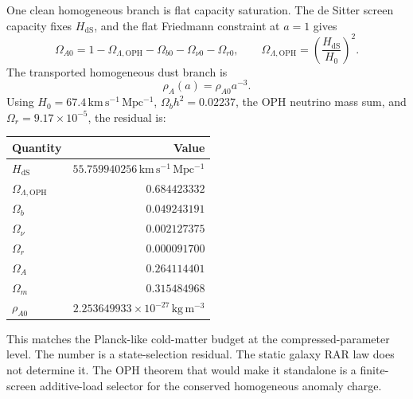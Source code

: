 \documentclass[11pt]{article}
\newcommand{\OPH}{\mathrm{OPH}}
\begin{document}
One clean homogeneous branch is flat capacity saturation.  The de Sitter screen
capacity fixes \(H_{\mathrm{dS}}\), and the flat Friedmann constraint at
\(a=1\) gives
\begin{equation}
  \Omega_{A0}
  =
  1-\Omega_{\Lambda,\OPH}-\Omega_{b0}-\Omega_{\nu0}-\Omega_{r0},
  \qquad
  \Omega_{\Lambda,\OPH}
  =
  \left(\frac{H_{\mathrm{dS}}}{H_0}\right)^2.
  \label{eq:flatresidual}
\end{equation}
The transported homogeneous dust branch is
\begin{equation}
  \rho_A(a)=\rho_{A0}a^{-3}.
\end{equation}
Using \(H_0=67.4\,\mathrm{km\,s^{-1}\,Mpc^{-1}}\),
\(\Omega_b h^2=0.02237\), the OPH neutrino mass sum, and
\(\Omega_r=9.17\times10^{-5}\), the residual is:
\begin{center}
\begin{tabular}{@{}lr@{}}
\toprule
Quantity & Value \\
\midrule
\(H_{\mathrm{dS}}\) & \(55.759940256\,\mathrm{km\,s^{-1}\,Mpc^{-1}}\) \\
\(\Omega_{\Lambda,\OPH}\) & \(0.684423332\) \\
\(\Omega_b\) & \(0.049243191\) \\
\(\Omega_\nu\) & \(0.002127375\) \\
\(\Omega_r\) & \(0.000091700\) \\
\(\Omega_A\) & \(0.264114401\) \\
\(\Omega_m\) & \(0.315484968\) \\
\(\rho_{A0}\) & \(2.253649933\times10^{-27}\,\mathrm{kg\,m^{-3}}\) \\
\bottomrule
\end{tabular}
\end{center}
This matches the Planck-like cold-matter budget at the compressed-parameter
level.  The number is a state-selection residual.  The static galaxy RAR law
does not determine it.  The OPH theorem that would make it standalone is a
finite-screen additive-load selector for the conserved homogeneous anomaly
charge.
\end{document}
